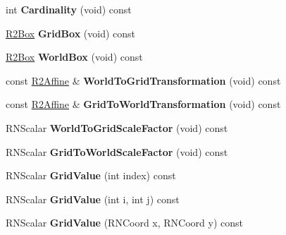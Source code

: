 \begin{DoxyCompactItemize}
\item 
int {\bfseries Cardinality} (void) const \hypertarget{class_r2_grid_aac8ae614d9148e2f3ecfa3c577cc3022}{}\label{class_r2_grid_aac8ae614d9148e2f3ecfa3c577cc3022}

\item 
\hyperlink{class_r2_box}{R2\+Box} {\bfseries Grid\+Box} (void) const \hypertarget{class_r2_grid_a861292fc29d4e2fee0572d4eb345cb0a}{}\label{class_r2_grid_a861292fc29d4e2fee0572d4eb345cb0a}

\item 
\hyperlink{class_r2_box}{R2\+Box} {\bfseries World\+Box} (void) const \hypertarget{class_r2_grid_ac9728ec945398ce1e5790d71a30c4dd0}{}\label{class_r2_grid_ac9728ec945398ce1e5790d71a30c4dd0}

\item 
const \hyperlink{class_r2_affine}{R2\+Affine} \& {\bfseries World\+To\+Grid\+Transformation} (void) const \hypertarget{class_r2_grid_a838c13ecb2cb107d6a5d28a26071da4c}{}\label{class_r2_grid_a838c13ecb2cb107d6a5d28a26071da4c}

\item 
const \hyperlink{class_r2_affine}{R2\+Affine} \& {\bfseries Grid\+To\+World\+Transformation} (void) const \hypertarget{class_r2_grid_a0b8d8fcfa7c28cc83a22f442e40def08}{}\label{class_r2_grid_a0b8d8fcfa7c28cc83a22f442e40def08}

\item 
R\+N\+Scalar {\bfseries World\+To\+Grid\+Scale\+Factor} (void) const \hypertarget{class_r2_grid_aa3c4cf4eb6ec3b53e6565d56a547389e}{}\label{class_r2_grid_aa3c4cf4eb6ec3b53e6565d56a547389e}

\item 
R\+N\+Scalar {\bfseries Grid\+To\+World\+Scale\+Factor} (void) const \hypertarget{class_r2_grid_ac1fa8422826106729cfe6471fa169995}{}\label{class_r2_grid_ac1fa8422826106729cfe6471fa169995}

\item 
R\+N\+Scalar {\bfseries Grid\+Value} (int index) const \hypertarget{class_r2_grid_a3d4fb1adf7c6ad8008eacd60c6fb444b}{}\label{class_r2_grid_a3d4fb1adf7c6ad8008eacd60c6fb444b}

\item 
R\+N\+Scalar {\bfseries Grid\+Value} (int i, int j) const \hypertarget{class_r2_grid_a0d22350f9a6e483a898d60b4514231d3}{}\label{class_r2_grid_a0d22350f9a6e483a898d60b4514231d3}

\item 
R\+N\+Scalar {\bfseries Grid\+Value} (R\+N\+Coord x, R\+N\+Coord y) const \hypertarget{class_r2_grid_a848cdfc1015bd14499914683d185daf0}{}\label{class_r2_grid_a848cdfc1015bd14499914683d185daf0}


\end{DoxyCompactItemize}
